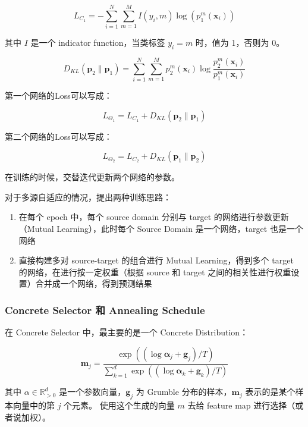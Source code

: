 \documentclass[UTF8]{ctexart}
\begin{document}
                $$
                    L_{C_{1}} = - \sum_{i=1}^{N} \sum_{m=1}^{M} I(y_{i}, m) \log(p_{1}^{m}(\boldsymbol{x}_i))
                $$

                其中 $I$ 是一个 indicator function，当类标签 $y_i = m$ 时，值为 1，否则为 0。

                $$
                    D_{KL}(\boldsymbol{p}_{2}\|\boldsymbol{p}_{1}) = \sum_{i=1}^{N} \sum_{m=1}^{M} p_{2}^{m}(\boldsymbol{x}_i) \log \frac{p_{2}^{m}(\boldsymbol{x}_i)}{p_{1}^{m}(\boldsymbol{x}_i)}
                $$

                第一个网络的Loss可以写成：

                $$
                    L_{\Theta_{1}} = L_{C_{1}} + D_{KL}(\boldsymbol{p}_{2}\|\boldsymbol{p}_{1})
                $$

                第二个网络的Loss可以写成：

                $$
                    L_{\Theta_{2}} = L_{C_{2}} + D_{KL}(\boldsymbol{p}_{1}\|\boldsymbol{p}_{2})
                $$

                在训练的时候，交替迭代更新两个网络的参数。

                对于多源自适应的情况，提出两种训练思路：

                \begin{enumerate}
                    \item 在每个 epoch 中，每个 source domain 分别与 target 的网络进行参数更新（Mutual Learning），此时每个 Source Domain 是一个网络，target 也是一个网络
                    \item 直接构建多对 source-target 的组合进行 Mutual Learning，得到多个 target 的网络，在进行按一定权重（根据 source 和 target 之间的相关性进行权重设置）合并成一个网络，得到预测结果
                \end{enumerate}
            \subsubsection{Concrete Selector 和 Annealing Schedule}
                在 Concrete Selector 中，最主要的是一个 Concrete Distribution：

                $$
                    \mathbf{m}_j = \frac{\exp((\log \mathbf{\alpha}_j + \mathbf{g}_j)/T)}{\sum_{k=1}^d \exp((\log \mathbf{\alpha}_k + \mathbf{g}_k)/T)}
                $$

                其中 $\alpha \in \mathbb{R}^d_{>0}$ 是一个参数向量，$\textbf{g}_j$ 为 Grumble 分布的样本，$\mathbf{m}_j$ 表示的是某个样本向量中的第 $j$ 个元素。
                使用这个生成的向量 $m$ 去给 feature map 进行选择（或者说加权）。
\end{document}
